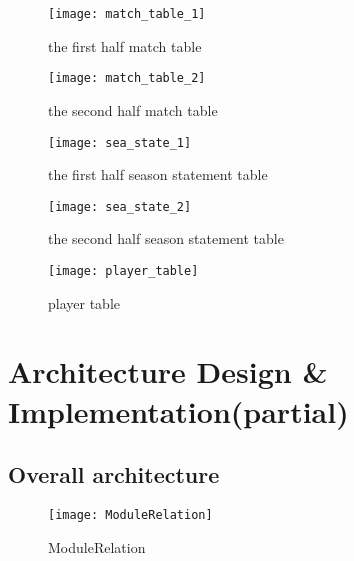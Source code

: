 \documentclass[conference,compsoc, twocolumn]{IEEEtran}
\begin{document}
\begin{figure}[H]
\centering\texttt{[image: match\_table\_1]}
\caption{the first half match table}
\end{figure}

\begin{figure}[H]
\centering\texttt{[image: match\_table\_2]}
\caption{the second half match table}
\end{figure}

\begin{figure}[H]
\centering\texttt{[image: sea\_state\_1]}
\caption{the first half season statement table}
\end{figure}

\begin{figure}[H]
\centering\texttt{[image: sea\_state\_2]}
\caption{the second half season statement table}
\end{figure}

\begin{figure}[H]
\centering\texttt{[image: player\_table]}
\caption{player table}
\end{figure}




\section{Architecture Design \& Implementation(partial)}

\subsection{Overall architecture}


\begin{figure}[H]
\centering\texttt{[image: ModuleRelation]}
\caption{ModuleRelation}
\end{figure}
\end{document}
